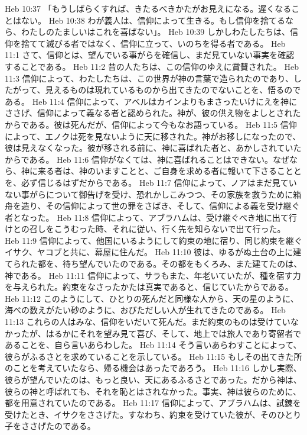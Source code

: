 Heb 10:37  「もうしばらくすれば、きたるべきかたがお見えになる。遅くなることはない。
Heb 10:38  わが義人は、信仰によって生きる。もし信仰を捨てるなら、わたしのたましいはこれを喜ばない」。
Heb 10:39  しかしわたしたちは、信仰を捨てて滅びる者ではなく、信仰に立って、いのちを得る者である。
Heb 11:1  さて、信仰とは、望んでいる事がらを確信し、まだ見ていない事実を確認することである。
Heb 11:2  昔の人たちは、この信仰のゆえに賞賛された。
Heb 11:3  信仰によって、わたしたちは、この世界が神の言葉で造られたのであり、したがって、見えるものは現れているものから出てきたのでないことを、悟るのである。
Heb 11:4  信仰によって、アベルはカインよりもまさったいけにえを神にささげ、信仰によって義なる者と認められた。神が、彼の供え物をよしとされたからである。彼は死んだが、信仰によって今もなお語っている。
Heb 11:5  信仰によって、エノクは死を見ないように天に移された。神がお移しになったので、彼は見えなくなった。彼が移される前に、神に喜ばれた者と、あかしされていたからである。
Heb 11:6  信仰がなくては、神に喜ばれることはできない。なぜなら、神に来る者は、神のいますことと、ご自身を求める者に報いて下さることとを、必ず信じるはずだからである。
Heb 11:7  信仰によって、ノアはまだ見ていない事がらについて御告げを受け、恐れかしこみつつ、その家族を救うために箱舟を造り、その信仰によって世の罪をさばき、そして、信仰による義を受け継ぐ者となった。
Heb 11:8  信仰によって、アブラハムは、受け継ぐべき地に出て行けとの召しをこうむった時、それに従い、行く先を知らないで出て行った。
Heb 11:9  信仰によって、他国にいるようにして約束の地に宿り、同じ約束を継ぐイサク、ヤコブと共に、幕屋に住んだ。
Heb 11:10  彼は、ゆるがぬ土台の上に建てられた都を、待ち望んでいたのである。その都をもくろみ、また建てたのは、神である。
Heb 11:11  信仰によって、サラもまた、年老いていたが、種を宿す力を与えられた。約束をなさったかたは真実であると、信じていたからである。
Heb 11:12  このようにして、ひとりの死んだと同様な人から、天の星のように、海べの数えがたい砂のように、おびただしい人が生れてきたのである。
Heb 11:13  これらの人はみな、信仰をいだいて死んだ。まだ約束のものは受けていなかったが、はるかにそれを望み見て喜び、そして、地上では旅人であり寄留者であることを、自ら言いあらわした。
Heb 11:14  そう言いあらわすことによって、彼らがふるさとを求めていることを示している。
Heb 11:15  もしその出てきた所のことを考えていたなら、帰る機会はあったであろう。
Heb 11:16  しかし実際、彼らが望んでいたのは、もっと良い、天にあるふるさとであった。だから神は、彼らの神と呼ばれても、それを恥とはされなかった。事実、神は彼らのために、都を用意されていたのである。
Heb 11:17  信仰によって、アブラハムは、試錬を受けたとき、イサクをささげた。すなわち、約束を受けていた彼が、そのひとり子をささげたのである。
